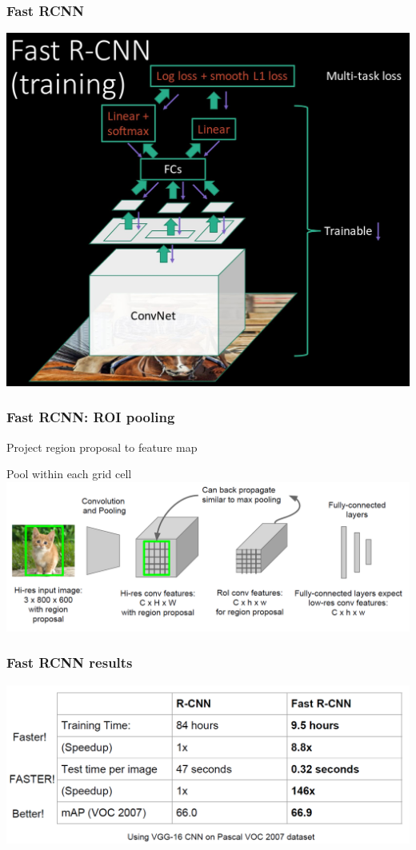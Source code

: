 \documentclass[xcolor=dvipsnames]{beamer}
\begin{document}
\begin{frame}
  \frametitle{Fast RCNN}
  \includegraphics[height=.8\textheight]{fast-rcnn-train}
\end{frame}


\begin{frame}
  \frametitle{Fast RCNN: ROI pooling}
\bi
\item Project region proposal to feature map
\item Pool within each grid cell
\ei
  \includegraphics[width=.9\textwidth]{fast-rcnn-roi-pooling}
\end{frame}

\begin{frame}
  \frametitle{Fast RCNN results}
  \includegraphics[width=.8\textwidth]{fast-rcnn-results}
\end{frame}
\end{document}
